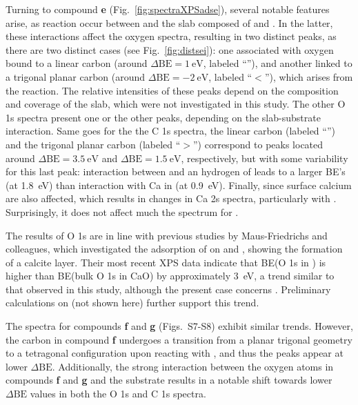 \documentclass[%
aip,
amsmath,amssymb,
preprint,%
jcp,
showkeys,
]{revtex4-2}
\def\dbe{\ensuremath{\Delta\text{BE}}}
\begin{document}
Turning to compound \textbf{e} (Fig.~\ref{fig:spectraXPSadse}), several notable features arise, as reaction occur between  and the slab composed of  and . In the latter, these interactions affect the oxygen spectra, resulting in two distinct peaks, as there are two distinct cases (see Fig.~\ref{fig:distsei}): one associated with oxygen bound to a linear carbon (around $\dbe = \SI{1}{\electronvolt}$, labeled ``''), and another linked to a trigonal planar carbon (around $\dbe = \SI{-2}{\electronvolt}$, labeled ``$<$''), which arises from the reaction. The relative intensities of these peaks depend on the composition and coverage of the slab, which were not investigated in this study. The other O 1s spectra present one or the other peaks, depending on the slab-substrate interaction. Same goes for the the C 1s spectra, the linear carbon (labeled ``'') and the trigonal planar carbon (labeled ``$>$'') correspond to peaks located around $\dbe = \SI{3.5}{\electronvolt}$ and $\dbe = \SI{1.5}{\electronvolt}$, respectively, but with some variability for this last peak: interaction between  and an hydrogen of  leads to a larger BE's (at \SI{1.8}{\electronvolt}) than interaction with Ca in  (at \SI{0.9}{\electronvolt}). Finally, since surface calcium are also affected, which results in changes in Ca 2s spectra, particularly with . Surprisingly, it does not affect much the spectrum for .

The results of O 1s are in line with previous studies by Maus-Friedrichs and colleagues\cite{ochsCO2ChemisorptionCa1998,voigtsAdsorptionCO2CO2009,dahleSituPreparationCalcium2012}, which investigated the adsorption of  on  and , showing the formation of a calcite layer. Their most recent XPS data\cite{dahleSituPreparationCalcium2012} indicate that BE(O 1s in ) is higher than BE(bulk O 1s in CaO) by approximately \SI{3}{\electronvolt}, a trend similar to that observed in this study, although the present case concerns . Preliminary calculations on  (not shown here) further support this trend. %

The spectra for compounds \textbf{f} and \textbf{g} (Figs.~S7-S8) exhibit similar trends. However, the carbon in compound \textbf{f} undergoes a transition from a planar trigonal geometry to a tetragonal configuration upon reacting with , and thus the peaks appear at lower \dbe{}. Additionally, the strong interaction between the oxygen atoms in compounds \textbf{f} and \textbf{g} and the  substrate results in a notable shift towards lower \dbe{} values in both the O 1s and C 1s spectra.
\end{document}
